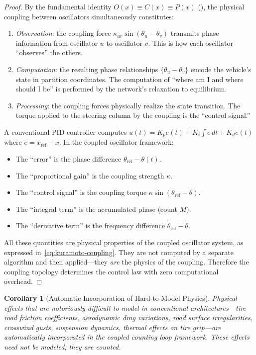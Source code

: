 \documentclass[twocolumn,10pt]{article}
\newtheorem{corollary}[theorem]{Corollary}
\theoremstyle{definition}
\begin{document}
\begin{proof}
By the fundamental identity $O(x) \equiv C(x) \equiv P(x)$ (), the physical coupling between oscillators simultaneously constitutes:
\begin{enumerate}
\item \emph{Observation}: the coupling force $\kappa_{uv}\sin(\theta_u - \theta_v)$ transmits phase information from oscillator $u$ to oscillator $v$. This is how each oscillator ``observes'' the others.
\item \emph{Computation}: the resulting phase relationships $\{\theta_u - \theta_v\}$ encode the vehicle's state in partition coordinates. The computation of ``where am I and where should I be'' is performed by the network's relaxation to equilibrium.
\item \emph{Processing}: the coupling forces physically realize the state transition. The torque applied to the steering column by the coupling is the ``control signal.''
\end{enumerate}

A conventional PID controller computes $u(t) = K_p e(t) + K_i \int e \, dt + K_d \dot{e}(t)$ where $e = x_{\mathrm{ref}} - x$. In the coupled oscillator framework:
\begin{itemize}[leftmargin=*]
\item The ``error'' is the phase difference $\theta_{\mathrm{ref}} - \theta(t)$.
\item The ``proportional gain'' is the coupling strength $\kappa$.
\item The ``control signal'' is the coupling torque $\kappa \sin(\theta_{\mathrm{ref}} - \theta)$.
\item The ``integral term'' is the accumulated phase (count $M$).
\item The ``derivative term'' is the frequency difference $\dot{\theta}_{\mathrm{ref}} - \dot{\theta}$.
\end{itemize}
All these quantities are physical properties of the coupled oscillator system, as expressed in~\eqref{eq:kuramoto-coupling}. They are not computed by a separate algorithm and then applied---they \emph{are} the physics of the coupling. Therefore the coupling topology determines the control law with zero computational overhead.
\end{proof}

\begin{corollary}[Automatic Incorporation of Hard-to-Model Physics]
\label{cor:hard-physics}
Physical effects that are notoriously difficult to model in conventional architectures---tire-road friction coefficients, aerodynamic drag variations, road surface irregularities, crosswind gusts, suspension dynamics, thermal effects on tire grip---are automatically incorporated in the coupled counting loop framework. These effects need not be modeled; they are \emph{counted}.
\end{corollary}
\end{document}
